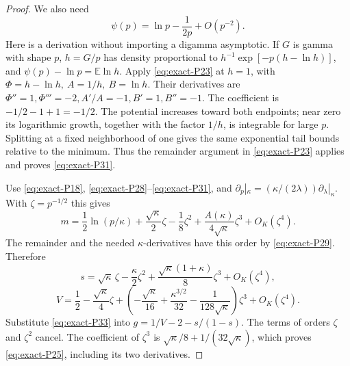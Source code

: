 \begin{proof}
We also need
\begin{equation}
 \psi(p)=\ln p-\frac1{2p}+O(p^{-2}).                  \label{eq:exact-P31}
\end{equation}
Here is a derivation without importing a digamma asymptotic. If \(G\) is gamma with shape \(p\), \(h=G/p\) has density proportional to
\(h^{-1}\exp[-p(h-\ln h)]\), and \(\psi(p)-\ln p=\mathbb{E}\ln h\).
Apply \eqref{eq:exact-P23} at \(h=1\), with
\(\Phi=h-\ln h,\ A=1/h,\ B=\ln h\).
Their derivatives are
\(\Phi''=1,\Phi'''=-2,A'/A=-1,B'=1,B''=-1\).
The coefficient is \(-1/2-1+1=-1/2\).
The potential increases toward both endpoints; near zero its logarithmic growth, together with the factor \(1/h\), is integrable for large \(p\). Splitting at a fixed neighborhood of one gives the same exponential tail bounds relative to the minimum. Thus the remainder argument in \eqref{eq:exact-P23} applies and proves \eqref{eq:exact-P31}.

Use \eqref{eq:exact-P18}, \eqref{eq:exact-P28}--\eqref{eq:exact-P31}, and
\(\partial_p|_\kappa=(\kappa/(2\lambda))\partial_\lambda|_\kappa\).
With \(\zeta=p^{-1/2}\) this gives
\begin{equation}
 m=\frac12\ln(p/\kappa)
    +\frac{\sqrt\kappa}{2}\zeta-\frac18\zeta^2
    +\frac{A(\kappa)}{4\sqrt\kappa}\zeta^3+O_K(\zeta^4).
                                                               \label{eq:exact-P32}
\end{equation}
The remainder and the needed \(\kappa\)-derivatives have this order by \eqref{eq:exact-P29}. Therefore
\begin{equation}
 s=\sqrt\kappa\,\zeta-\frac\kappa2 \zeta^2
       +\frac{\sqrt\kappa(1+\kappa)}8 \zeta^3+O_K(\zeta^4),
\end{equation}
\begin{equation}
 V=\frac12-\frac{\sqrt\kappa}{4}\zeta
   +\left(-\frac{\sqrt\kappa}{16}
          +\frac{\kappa^{3/2}}{32}
          -\frac1{128\sqrt\kappa}\right)\zeta^3
   +O_K(\zeta^4).                                        \label{eq:exact-P33}
\end{equation}
Substitute \eqref{eq:exact-P33} into \(g=1/V-2-s/(1-s)\). The terms of orders \(\zeta\) and \(\zeta^2\) cancel. The coefficient of \(\zeta^3\) is
\(\sqrt\kappa/8+1/(32\sqrt\kappa)\), which proves \eqref{eq:exact-P25}, including its two derivatives.


\end{proof}
